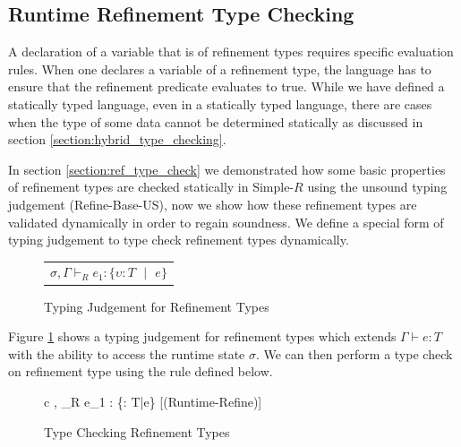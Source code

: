 \documentclass[a4paper,12pt]{report}
\begin{document}
\subsection{Runtime Refinement Type Checking} \label{section:runtime_refine}
A declaration of a variable that is of refinement types requires specific 
evaluation rules. When one declares a variable of a refinement type, the language 
has to ensure that the refinement predicate evaluates to true. While we have 
defined a statically typed language, even in a statically typed language, 
there are cases when the type of some data cannot be determined statically as 
discussed in section \ref{section:hybrid_type_checking}.

\par
In section \ref{section:ref_type_check} we demonstrated how some basic properties 
of refinement types are checked statically in Simple-$R$ using 
the unsound typing judgement (Refine-Base-US), now we show 
how these refinement types are validated dynamically in order to regain soundness. 
We define a special form of typing judgement to type check refinement types 
dynamically.

\begin{figure}[H]
  \begin{center}
    \begin{tabular} {c}
      $\sigma, \Gamma \vdash_{R} e_1 : \{\upsilon : T \text{ }|\text{ }e\}$
    \end{tabular}
  \end{center}
  \caption{Typing Judgement for Refinement Types}
  \label{fig:refine_judgement}
\end{figure}

\par
Figure \ref{fig:refine_judgement} shows a typing judgement for refinement 
types which extends $\Gamma \vdash e : T$ with the 
ability to access the runtime state $\sigma$. We can then 
perform a type check on refinement type using the rule defined below. 

\begin{figure}[H]
  \begin{center}
    \begin{tabular} {c}
      {\sigma, \Gamma \vdash_{R} e_1 : \{\upsilon : T\text{ }|\text{ }e\}} [(Runtime-Refine)]
    \end{tabular}
  \end{center}
  \caption{Type Checking Refinement Types}
  \label{fig:refine_typecheck}
\end{figure}
\end{document}
